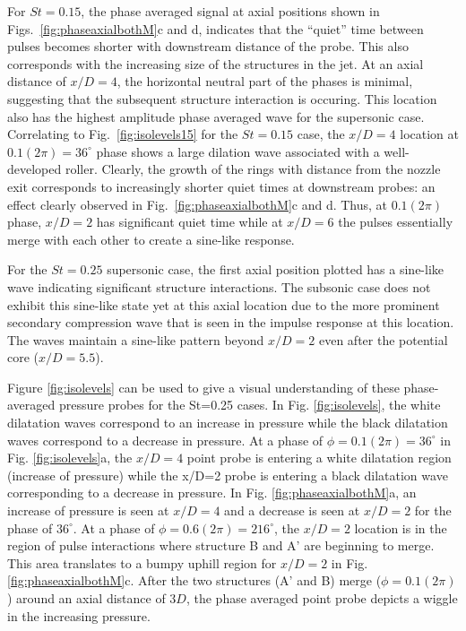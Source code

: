\documentclass[english]{aiaa-tc}
\begin{document}
For $St=0.15$, the phase averaged signal at axial positions shown in
Figs.~\ref{fig:phaseaxialbothM}c and d, indicates that the ``quiet'' time between
pulses becomes shorter with downstream distance of the probe.  This
also corresponds with the increasing size of the structures in the jet. At an
axial distance of $x/D=4$, the horizontal neutral part of the phases
is minimal, suggesting that the subsequent structure interaction is occuring. This location also has the
highest amplitude phase averaged wave for the supersonic case.  Correlating to
Fig.~\ref{fig:isolevels15} for the $St=0.15$ case, the $x/D=4$ location at 
$0.1(2\pi)=36^\circ$ phase shows a large dilation wave associated with
a well-developed roller. Clearly, the growth of the rings with
distance from the nozzle exit corresponds to increasingly shorter
quiet times at downstream probes: an effect clearly observed in
Fig.~\ref{fig:phaseaxialbothM}c and d.  Thus, at $0.1(2\pi)$ phase, $x/D=2$ has
significant quiet time while at $x/D=6$ the pulses essentially merge
with each other to create a sine-like response.

For the $St=0.25$ supersonic case, the first axial position plotted has a sine-like wave indicating significant structure interactions. The subsonic case does not exhibit this sine-like state yet at this axial location due to the more prominent secondary compression wave that is seen in the impulse response at this location. The waves maintain a sine-like pattern beyond $x/D=2$ even after the potential core ($x/D=5.5$). 

Figure \ref{fig:isolevels} can be used to give a visual understanding of these phase-averaged pressure probes for the St=0.25 cases. In Fig. \ref{fig:isolevels}, the white dilatation waves correspond to an increase in pressure while the black dilatation waves correspond to a decrease in pressure. At a phase of $\phi=0.1(2\pi)=36^\circ$ in Fig. \ref{fig:isolevels}a, the $x/D=4$ point probe is entering a white dilatation region (increase of pressure) while the x/D=2 probe is entering a black dilatation wave corresponding to a decrease in pressure. In Fig. \ref{fig:phaseaxialbothM}a, an increase of pressure is seen at $x/D=4$ and a decrease is seen at $x/D=2$ for the phase of $36^\circ$. At a phase of $\phi=0.6(2\pi)=216^\circ$, the $x/D=2$ location is in the region of pulse interactions where structure B and A' are beginning to merge. This area translates to a bumpy uphill region for $x/D=2$ in Fig. \ref{fig:phaseaxialbothM}c. After the two structures (A' and B) merge ($\phi=0.1(2\pi)$) around an axial distance of $3D$, the phase averaged point probe depicts a wiggle in the increasing pressure. 
\end{document}
